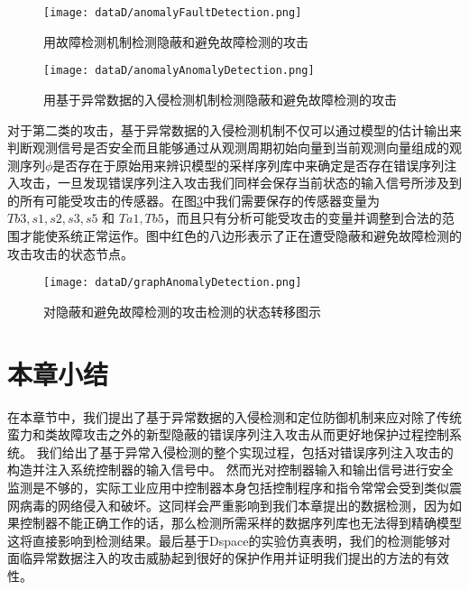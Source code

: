 		\begin{figure}[!htb]
			\centering
			\texttt{[image: dataD/anomalyFaultDetection.png]}
			\caption{用故障检测机制检测隐蔽和避免故障检测的攻击}
			\label{fig118}
		\end{figure}
		
		\begin{figure}[!htb]
			\centering
			\texttt{[image: dataD/anomalyAnomalyDetection.png]}
			\caption{用基于异常数据的入侵检测机制检测隐蔽和避免故障检测的攻击}
			\label{fig119}
		\end{figure}
	
	
	对于第二类的攻击，基于异常数据的入侵检测机制不仅可以通过模型的估计输出来判断观测信号是否安全而且能够通过从观测周期初始向量到当前观测向量组成的观测序列$\phi$是否存在于原始用来辨识模型的采样序列库中来确定是否存在错误序列注入攻击，一旦发现错误序列注入攻击我们同样会保存当前状态的输入信号所涉及到的所有可能受攻击的传感器。在图\ref{fig120}中我们需要保存的传感器变量为$Tb3,s1,s2,s3,s5$ 和 $Ta1,Tb5$，而且只有分析可能受攻击的变量并调整到合法的范围才能使系统正常运作。图中红色的八边形表示了正在遭受隐蔽和避免故障检测的攻击攻击的状态节点。
	
	\begin{figure}[!htb]
		\centering
		\texttt{[image: dataD/graphAnomalyDetection.png]}
		\caption{对隐蔽和避免故障检测的攻击检测的状态转移图示}
		\label{fig120}
	\end{figure}

\section{本章小结}
\label{sec:insertimage}

在本章节中，我们提出了基于异常数据的入侵检测和定位防御机制来应对除了传统蛮力和类故障攻击之外的新型隐蔽的错误序列注入攻击从而更好地保护过程控制系统。 我们给出了基于异常入侵检测的整个实现过程，包括对错误序列注入攻击的构造并注入系统控制器的输入信号中。 然而光对控制器输入和输出信号进行安全监测是不够的，实际工业应用中控制器本身包括控制程序和指令常常会受到类似震网病毒的网络侵入和破坏。这同样会严重影响到我们本章提出的数据检测，因为如果控制器不能正确工作的话，那么检测所需采样的数据序列库也无法得到精确模型这将直接影响到检测结果。最后基于Dspace的实验仿真表明，我们的检测能够对面临异常数据注入的攻击威胁起到很好的保护作用并证明我们提出的方法的有效性。
